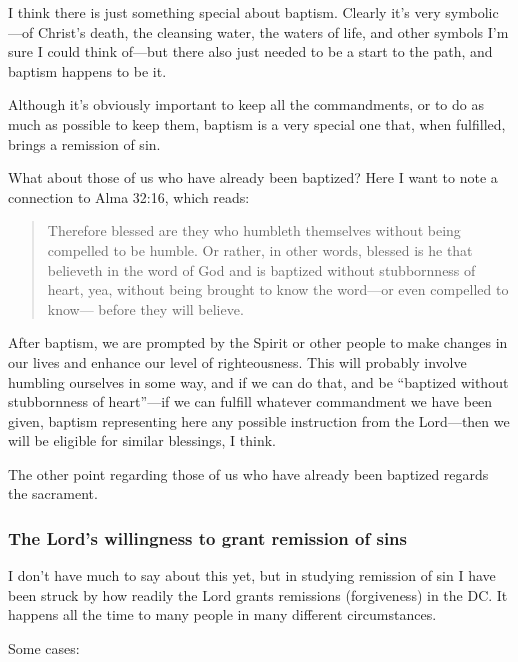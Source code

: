 				I think there is just something special about baptism. Clearly it's very symbolic---of Christ's death, the cleansing water, the waters of life, and other symbols I'm sure I could think of---but there also just needed to be a start to the path, and baptism happens to be it. 
				
				Although it's obviously important to keep all the commandments, or to do as much as possible to keep them, baptism is a very special one that, when fulfilled, brings a remission of sin.
				
				What about those of us who have already been baptized? Here I want to note a connection to Alma 32:16, which reads:
				
					\begin{quote}
						Therefore blessed are they who humbleth themselves without being compelled to be humble. Or rather, in other words, blessed is he that believeth in the word of God and is baptized without stubbornness of heart, yea, without being brought to know the word---or even compelled to know--- before they will believe. 
					\end{quote}
					
				After baptism, we are prompted by the Spirit or other people to make changes in our lives and enhance our level of righteousness. This will probably involve humbling ourselves in some way, and if we can do that, and be ``baptized without stubbornness of heart''---if we can fulfill whatever commandment we have been given, baptism representing here any possible instruction from the Lord---then we will be eligible for similar blessings, I think.
				
				The other point regarding those of us who have already been baptized regards the sacrament.
		
	\subsubsection{The Lord's willingness to grant remission of sins}
		\label{REMISSION-willingness}
		
		I don't have much to say about this yet, but in studying remission of sin I have been struck by how readily the Lord grants remissions (forgiveness) in the DC. It happens all the time to many people in many different circumstances.
		
		Some cases:
		
